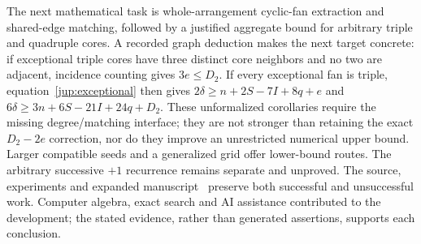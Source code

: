 The next mathematical task is whole-arrangement cyclic-fan extraction and shared-edge matching, followed by a justified aggregate bound for arbitrary triple and quadruple cores. A recorded graph deduction makes the next target concrete: if exceptional triple cores have three distinct core neighbors and no two are adjacent, incidence counting gives $3e\le D_2$. If every exceptional fan is triple, equation~\eqref{jup:exceptional} then gives $2\delta\ge n+2S-7I+8q+e$ and $6\delta\ge3n+6S-21I+24q+D_2$. These unformalized corollaries require the missing degree/matching interface; they are not stronger than retaining the exact $D_2-2e$ correction, nor do they improve an unrestricted numerical upper bound. Larger compatible seeds and a generalized grid offer lower-bound routes. The arbitrary successive $+1$ recurrence remains separate and unproved. The source, experiments and expanded manuscript~\cite{zarzueloRepository,zarzueloFull2026} preserve both successful and unsuccessful work. Computer algebra, exact search and AI assistance contributed to the development; the stated evidence, rather than generated assertions, supports each conclusion.
